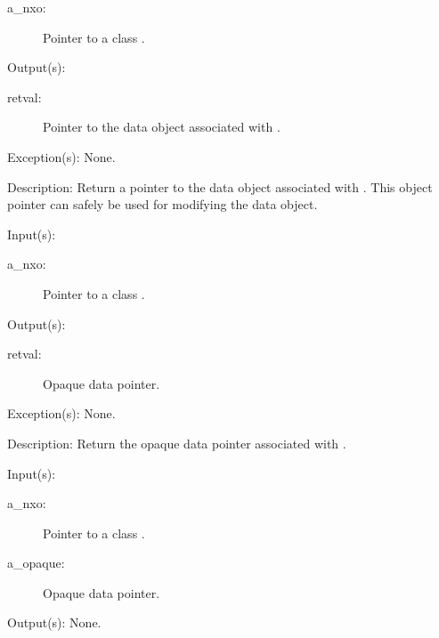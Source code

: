 \begin{capi}
\begin{capilist}
\begin{description}
		\item[a\_nxo: ]
			Pointer to a class .
		\end{description}
	\item[Output(s): ]
		\begin{description}\item[]
		\item[retval: ]
			Pointer to the data object associated with
			.
		\end{description}
	\item[Exception(s): ] None.
	\item[Description: ]
		Return a pointer to the data object associated with
		.  This object pointer can safely be used for
		modifying the data object.
	\end{capilist}
\label{nxo_class_opaque_get}
	\begin{capilist}
	\item[Input(s): ]
		\begin{description}\item[]
		\item[a\_nxo: ]
			Pointer to a class .
		\end{description}
	\item[Output(s): ]
		\begin{description}\item[]
		\item[retval: ]
			Opaque data pointer.
		\end{description}
	\item[Exception(s): ] None.
	\item[Description: ]
		Return the opaque data pointer associated with .
	\end{capilist}
\label{nxo_class_opaque_set}
	\begin{capilist}
	\item[Input(s): ]
		\begin{description}\item[]
		\item[a\_nxo: ]
			Pointer to a class \classname{nxo}.
		\item[a\_opaque: ]
			Opaque data pointer.
		\end{description}
	\item[Output(s): ] None.

\end{capilist}
\end{capi}
